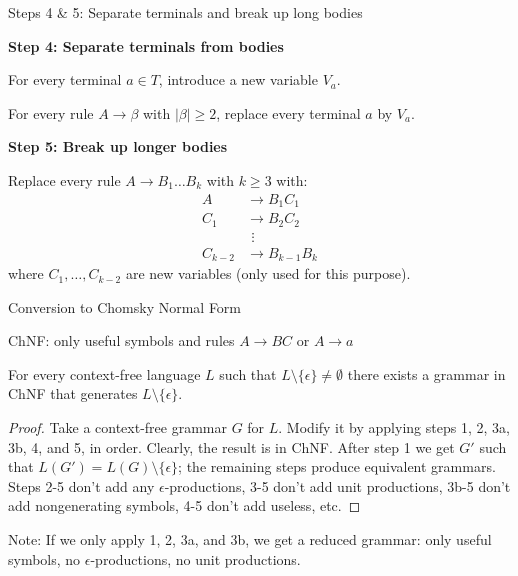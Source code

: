 \documentclass[handout]{beamer}
\begin{document}
\begin{frame}{Steps 4 \& 5: Separate terminals and break up long bodies}

	\textbf{Step 4: Separate terminals from bodies}

	For every terminal $a\in T$, introduce a new variable $V_a$.

	For every rule $A\to\beta$ with $|\beta|\geq 2$, replace every terminal $a$ by $V_a$.
	
	\bigskip

	\textbf{Step 5: Break up longer bodies}

	Replace every rule $A\to B_1\dots B_k$ with $k\geq 3$ with:
	\begin{align*}
		A&\to B_1 C_1\\
		C_1&\to B_2 C_2\\
		&\ \,\vdots\\
		C_{k-2}&\to B_{k-1}B_k
	\end{align*}
	where $C_1,\dots,C_{k-2}$ are new variables (only used for this purpose).
	
\end{frame}


\begin{frame}{Conversion to Chomsky Normal Form}

	ChNF: only useful symbols and rules \alert{$A\rightarrow BC$} or \alert{$A\rightarrow a$}
	
	\begin{theorem}
		For every context-free language $L$ such that $L\setminus \{\epsilon\}\neq \emptyset$ there exists a grammar in ChNF that generates $L\setminus \{\epsilon\}$.
	\end{theorem}
	\begin{proof}
		Take a context-free grammar $G$ for $L$. Modify it by applying steps 1, 2, 3a, 3b, 4, and 5, in order. Clearly, the result is in ChNF. After step 1 we get $G'$ such that $L(G')=L(G)\setminus \{\epsilon\}$; the remaining steps produce equivalent grammars. Steps 2-5 don't add any $\epsilon$-productions, 3-5 don't add unit productions, 3b-5 don't add nongenerating symbols, 4-5 don't add useless, etc.
	\end{proof}

	Note: If we only apply 1, 2, 3a, and 3b, we get a \alert{reduced} grammar: only useful symbols, no $\epsilon$-productions, no unit productions.

\end{frame}
\end{document}
